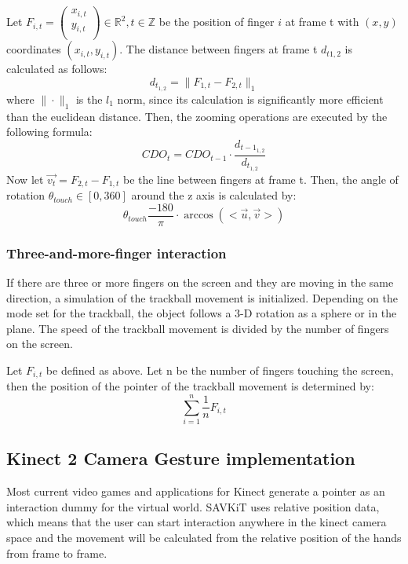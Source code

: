 \documentclass[12pt]{extarticle}
\newcommand{\R}{\mathbb{R}}
\newcommand{\Z}{\mathbb{Z}}
\begin{document}
Let $F_{i,t}=\begin{pmatrix} x_{i,t}\\y_{i,t}\\ \end{pmatrix} \in \R^2, t\in \Z$ be the position of finger $i$ at frame t with $(x,y)$ coordinates $(x_{i,t},y_{i,t})$. The distance between fingers at frame t $d_{t{{1,2}}}$ is calculated as follows:
$$d_{t_{1,2}}=\|F_{1,t}-F_{2,t}\|_1$$
where $\|\cdot \|_1$ is the $l_1$ norm, since its calculation is significantly more efficient than the euclidean distance. Then, the zooming operations are executed by the following formula:
$$CDO_t=CDO_{t-1}\cdot \frac{d_{t-1_{1,2}}}{d_{t_{1,2}}}$$
Now let $\overrightarrow{v_t}=F_{2,t}-F_{1,t}$ be the line between fingers at frame t. Then, the angle of rotation $\theta_{touch}\in [0,360]$ around the z axis is calculated by: 
\[\theta_{touch}\frac{-180}{\pi}\cdot \arccos(<\overrightarrow{u}, \overrightarrow{v}>)\]
\subsubsection* {Three-and-more-finger interaction}
If there are three or more fingers on the screen and they are moving in the same direction, a simulation of the trackball movement is initialized. Depending on the mode set for the trackball, the object follows a 3-D rotation as a sphere or in the plane. The speed of the trackball movement is divided by the number of fingers on the screen.

Let $F_{i,t}$ be defined as above. Let n be the number of fingers touching the screen, then the position of the pointer of the trackball movement is determined by:
$$\sum_{i=1}^n \frac{1}{n}F_{i,t}$$

\subsection {Kinect 2 Camera Gesture implementation}\label{KinectGestures}
Most current video games and applications for Kinect generate a pointer as an interaction dummy for the virtual world. SAVKiT uses relative position data, which means that the user can start interaction anywhere in the kinect camera space and the movement will be calculated from the relative position of the hands from frame to frame.
\end{document}
